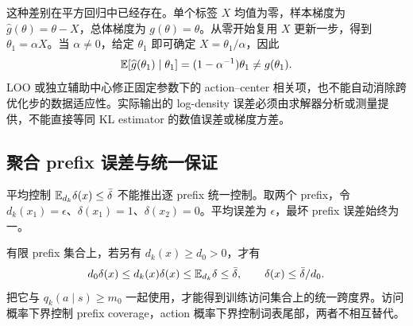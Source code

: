 这种差别在平方回归中已经存在。单个标签 $X$ 均值为零，样本梯度为 $\widehat g(\theta)=\theta-X$，总体梯度为 $g(\theta)=\theta$。从零开始复用 $X$ 更新一步，得到 $\theta_1=\alpha X$。当 $\alpha\ne0$，给定 $\theta_1$ 即可确定 $X=\theta_1/\alpha$，因此
\begin{equation}
\mathbb E[\widehat g(\theta_1)\mid\theta_1]
=(1-\alpha^{-1})\theta_1\ne g(\theta_1).
\end{equation}
LOO 或独立辅助中心修正固定参数下的 action--center 相关项，也不能自动消除跨优化步的数据适应性。实际输出的 log-density 误差必须由求解器分析或测量提供，不能直接等同 KL estimator 的数值误差或梯度方差。

\subsection{聚合 prefix 误差与统一保证}
\label{dyn:coverage-gap}

平均控制 $\mathbb E_{d_k}\delta(x)\le\bar\delta$ 不能推出逐 prefix 统一控制。取两个 prefix，令 $d_k(x_1)=\epsilon$、$\delta(x_1)=1$、$\delta(x_2)=0$。平均误差为 $\epsilon$，最坏 prefix 误差始终为一。

有限 prefix 集合上，若另有 $d_k(x)\ge d_0>0$，才有
\begin{equation}
d_0\delta(x)\le d_k(x)\delta(x)\le\mathbb E_{d_k}\delta\le\bar\delta,
\qquad\delta(x)\le\bar\delta/d_0.
\end{equation}
把它与 $q_k(a\mid s)\ge m_0$ 一起使用，才能得到训练访问集合上的统一跨度界。访问概率下界控制 prefix coverage，action 概率下界控制词表尾部，两者不相互替代。
